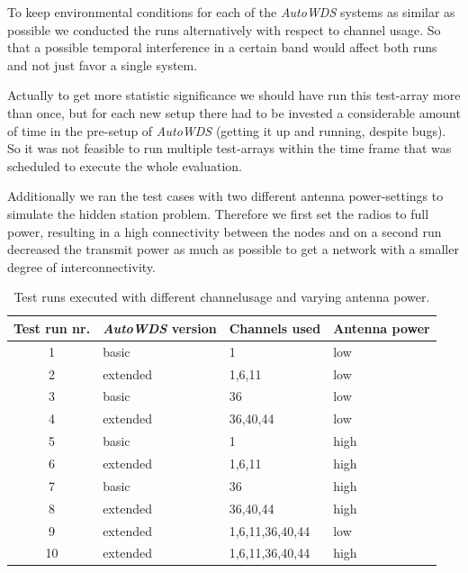     To keep environmental conditions for each of the \textit{AutoWDS} systems as similar as possible we conducted the runs alternatively with respect to channel usage.
    So that a possible temporal interference in a certain band would affect both runs and not just favor a single system.
  
    Actually to get more statistic significance we should have run this test-array more than once,
    but for each new setup there had to be invested a considerable amount of time in the pre-setup of \textit{AutoWDS} (getting it up and running, despite bugs).
    So it was not feasible to run multiple test-arrays within the time frame that was scheduled to execute the whole evaluation.
    
    Additionally we ran the test cases with two different antenna power-settings to simulate the hidden station problem. 
    Therefore we first set the radios to full power, resulting in a high connectivity between the nodes and on a second 
    run decreased the transmit power as much as possible to get a network with a smaller degree of interconnectivity.
  
    \begin{table}[h!]
      \centering
      \begin{tabular}{clll}
	Test run nr. & \textit{AutoWDS} version & Channels used & Antenna power\\ \hline
	1 & basic & 1 & low \\
	2 & extended & 1,6,11 & low \\
	3 & basic & 36 & low \\
	4 & extended & 36,40,44 & low \\
	5 & basic & 1 & high \\
	6 & extended & 1,6,11 & high \\
	7 & basic & 36 & high \\
	8 & extended & 36,40,44 & high \\
	9 & extended & 1,6,11,36,40,44 & low \\
	10 & extended & 1,6,11,36,40,44 & high \\
      \end{tabular}
      \caption{Test runs executed with different channelusage and varying antenna power.}
      \label{tab:testruns}
    \end{table}
    
\newpage
    
